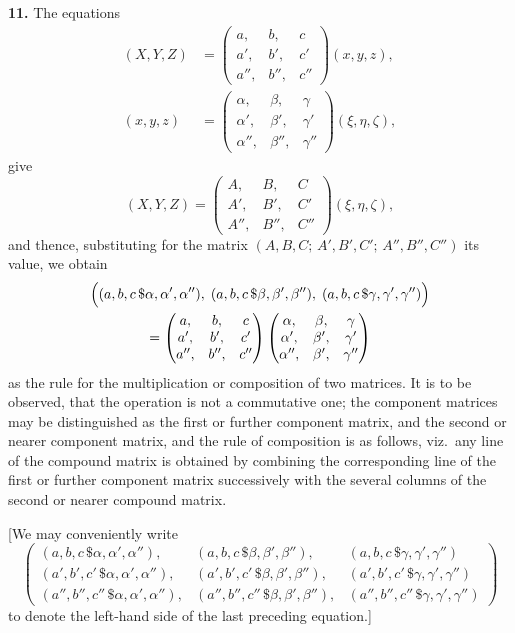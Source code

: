 \documentclass[11pt,a4paper]{book}
\begin{document}
\begin{center}
\medskip
\noindent\textbf{11.} The equations
\begin{align*}
(X,Y,Z) &= \begin{pmatrix} a, & b, & c \\ a', & b', & c' \\ a'', & b'', & c'' \end{pmatrix}(x,y,z), \\
(x,y,z) &= \begin{pmatrix} \alpha, & \beta, & \gamma \\ \alpha', & \beta', & \gamma' \\ \alpha'', & \beta'', & \gamma'' \end{pmatrix}(\xi,\eta,\zeta),
\end{align*}
give
\[
(X,Y,Z) = \begin{pmatrix} A, & B, & C \\ A', & B', & C' \\ A'', & B'', & C'' \end{pmatrix}(\xi,\eta,\zeta),
\]
and thence, substituting for the matrix $(A,B,C;\, A',B',C';\, A'',B'',C'')$ its value, we obtain
\begin{multline*}
\Bigl((a,b,c\,\$\alpha,\alpha',\alpha''),\; (a,b,c\,\$\beta,\beta',\beta''),\; (a,b,c\,\$\gamma,\gamma',\gamma'')\Bigr) \\
= \begin{pmatrix} a, & b, & c \\ a', & b', & c' \\ a'', & b'', & c'' \end{pmatrix}
\begin{pmatrix} \alpha, & \beta, & \gamma \\ \alpha', & \beta', & \gamma' \\ \alpha'', & \beta', & \gamma'' \end{pmatrix}
\end{multline*}
as the rule for the multiplication or composition of two matrices. It is to be observed, that the operation is not a commutative one; the component matrices may be distinguished as the first or further component matrix, and the second or nearer component matrix, and the rule of composition is as follows, viz.\ any line of the compound matrix is obtained by combining the corresponding line of the first or further component matrix successively with the several columns of the second or nearer compound matrix.

[We may conveniently write
\[
\begin{pmatrix}
(a,b,c\,\$\alpha,\alpha',\alpha''), & (a,b,c\,\$\beta,\beta',\beta''), & (a,b,c\,\$\gamma,\gamma',\gamma'') \\
(a',b',c'\,\$\alpha,\alpha',\alpha''), & (a',b',c'\,\$\beta,\beta',\beta''), & (a',b',c'\,\$\gamma,\gamma',\gamma'') \\
(a'',b'',c''\,\$\alpha,\alpha',\alpha''), & (a'',b'',c''\,\$\beta,\beta',\beta''), & (a'',b'',c''\,\$\gamma,\gamma',\gamma'')
\end{pmatrix}
\]
to denote the left-hand side of the last preceding equation.]


\end{center}
\end{document}
